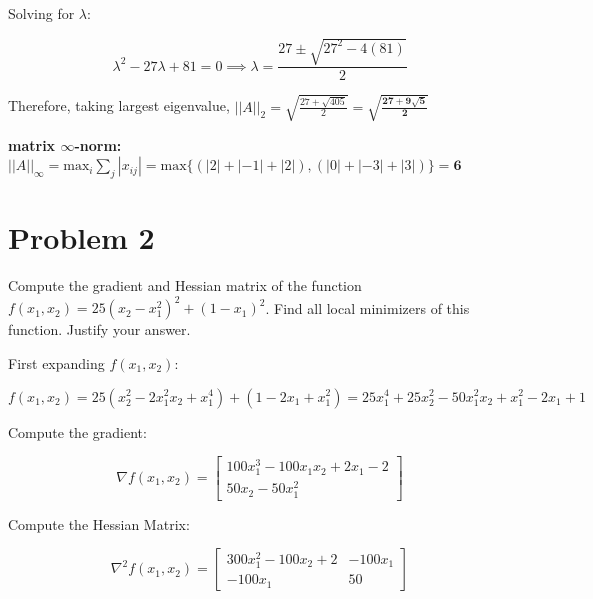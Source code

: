 \documentclass[12pt]{article}
\begin{document}
\vspace{3mm}

Solving for $\lambda:$ 

\vspace{3mm}

\[ \lambda^{2} - 27 \lambda + 81 = 0 \implies \lambda = \frac{27 \pm \sqrt{27^2 - 4(81)}}{2}\]

\vspace{3mm}

Therefore, taking largest eigenvalue, $||A||_{2} = \sqrt{\frac{27 + \sqrt{405}}{2}} = \bm{\sqrt{\frac{27 + 9 \sqrt{5}}{2}}}$

\vspace{9mm}

\textbf{matrix $\infty$-norm:} $||A||_{\infty} = \text{max}_{i}\sum_{j}|x_{ij}| = \text{max}\{(|2| + |-1| + |2|), (|0| + |-3| + |3|)\} = \bm{6}$

\newpage

\section*{Problem 2}

Compute the gradient and Hessian matrix of the function $f(x_1, x_2) = 25(x_2-x_1^2)^2 + (1-x_1)^2$. Find all local minimizers of this function. Justify your answer.

\vspace{9mm}

First expanding $f(x_{1}, x_{2})$:

\[f(x_{1},x_{2}) = 25(x_{2}^{2} - 2x_{1}^{2}x_{2} + x_{1}^{4}) + (1 - 2x_{1} + x_{1}^{2}) = 25x_{1}^{4} + 25x_{2}^{2} - 50x_{1}^{2}x_{2} + x_{1}^{2} - 2x_{1} + 1\]

\vspace{3mm}

Compute the gradient:

\[ \nabla f(x_{1}, x_{2}) = \left[\begin{array}{ccc} 100x_{1}^{3} - 100x_{1}x_{2} + 2x_{1}- 2 \\ 50x_{2} - 50x_{1}^{2} \end{array}\right] \]

\vspace{3mm}

Compute the Hessian Matrix:

\[ \nabla^{2}f(x_{1}, x_{2}) = \left[\begin{array}{ccc} 300x_{1}^{2} - 100x_{2} + 2 & - 100x_{1} \\ -100x_{1} & 50 \end{array}\right]\]
\end{document}
